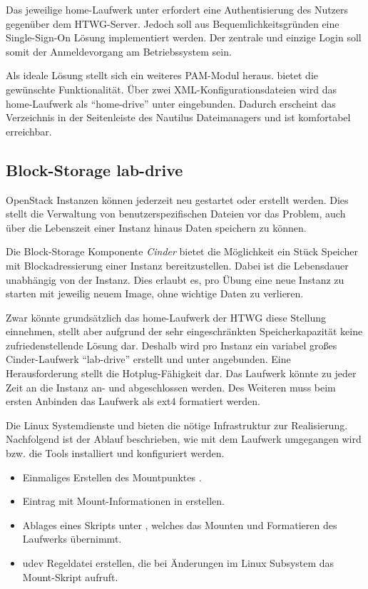 Das jeweilige home-Laufwerk unter  erfordert eine Authentisierung des Nutzers gegenüber dem HTWG-Server. 
Jedoch soll aus Bequemlichkeitsgründen eine Single-Sign-On Lösung implementiert werden.
Der zentrale und einzige Login soll somit der Anmeldevorgang am Betriebssystem sein.

Als ideale Lösung stellt sich ein weiteres PAM-Modul heraus.  bietet die gewünschte Funktionalität. 
Über zwei XML-Konfigurationsdateien wird das home-Laufwerk als \enquote{home-drive} unter  eingebunden.
Dadurch erscheint das Verzeichnis in der Seitenleiste des Nautilus Dateimanagers und ist komfortabel erreichbar.

\subsection{Block-Storage lab-drive}

OpenStack Instanzen können jederzeit neu gestartet oder erstellt werden.
Dies stellt die Verwaltung von benutzerspezifischen Dateien vor das Problem, auch über die Lebenszeit einer Instanz hinaus Daten speichern zu können. 

Die Block-Storage Komponente \emph{Cinder} bietet die Möglichkeit ein Stück Speicher mit Blockadressierung einer Instanz bereitzustellen. 
Dabei ist die Lebensdauer unabhängig von der Instanz. 
Dies erlaubt es, pro Übung eine neue Instanz zu starten mit jeweilig neuem Image, ohne wichtige Daten zu verlieren.

Zwar könnte grundsätzlich das home-Laufwerk der HTWG diese Stellung einnehmen, stellt aber aufgrund der sehr eingeschränkten Speicherkapazität keine zufriedenstellende Lösung dar.
Deshalb wird pro Instanz ein variabel großes Cinder-Laufwerk \enquote{lab-drive} erstellt und unter  angebunden.
Eine Herausforderung stellt die Hotplug-Fähigkeit dar. 
Das Laufwerk könnte zu jeder Zeit an die Instanz an- und abgeschlossen werden.
Des Weiteren muss beim ersten Anbinden das Laufwerk als ext4 formatiert werden.

Die Linux Systemdienste  und  bieten die nötige Infrastruktur zur Realisierung.
Nachfolgend ist der Ablauf beschrieben, wie mit dem Laufwerk umgegangen wird bzw. die Tools installiert und konfiguriert werden.

\begin{itemize}
\item Einmaliges Erstellen des Mountpunktes .
\item Eintrag mit Mount-Informationen in  erstellen.
\item Ablages eines Skripts unter , welches das Mounten und Formatieren des Laufwerks übernimmt.
\item udev Regeldatei erstellen, die bei Änderungen im Linux Subsystem  das Mount-Skript aufruft.
\end{itemize}

